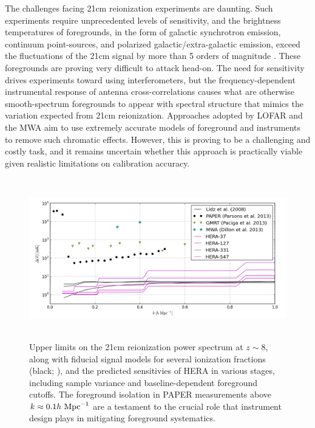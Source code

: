 \documentclass[preprint]{aastex}
\begin{document}
The challenges facing 21cm reionization experiments are daunting.  
Such experiments require unprecedented levels of sensitivity, and
the brightness temperatures of foregrounds, in the form of
galactic synchrotron emission, continuum point-sources, and polarized
galactic/extra-galactic emission, exceed the fluctuations of the 21cm signal by
more than 5 orders of magnitude
\citep{santos_et_al2005,pritchard_loeb2012,pober_et_al2013b}.
These foregrounds are proving very difficult to attack
head-on.  The need for sensitivity drives experiments toward
using interferometers, but the frequency-dependent instrumental
response of antenna cross-correlations 
causes what are otherwise smooth-spectrum foregrounds to 
appear with spectral structure that mimics the variation expected from 21cm reionization.
Approaches adopted by LOFAR and the MWA aim to use extremely accurate models of
foreground and instruments to
remove such chromatic effects.  However, this is proving to be a
challenging and costly task, and it remains uncertain whether this approach is
practically viable given realistic limitations on calibration accuracy.

\begin{figure}[!ht]\centering
\includegraphics[height=2.75in]{plots/eor_pspec.png}
\caption{\small
Upper limits on the 21cm reionization power spectrum at $z\sim8$, along
with fiducial signal models for several ionization fractions (black;
\citealt{lidz_et_al2008}),
and the predicted sensitivies of HERA in various stages, including sample variance
and baseline-dependent foreground cutoffs.
The foreground isolation in PAPER measurements
above $k\approx0.1h\ {\rm Mpc}^{-1}$
are a testament to the crucial role that instrument design
plays in mitigating foreground systematics.
}\label{fig:eor_pspec}
\end{figure}
\end{document}
